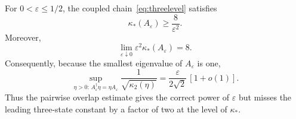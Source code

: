\begin{theorem}
\label{thm:metric_sandwich}
For $0<\varepsilon\leq1/2$, the coupled chain~\eqref{eq:threelevel}
satisfies
\begin{equation}\label{eq:metric_sandwich}
 \boxed{\kappa_*(A_\varepsilon)\geq\frac{8}{\varepsilon^2}.}
\end{equation}
Moreover,
\begin{equation}\label{eq:metric_limit}
 \boxed{\lim_{\varepsilon\downarrow0}
 \varepsilon^2\kappa_*(A_\varepsilon)=8.}
\end{equation}
Consequently, because the smallest eigenvalue of $A_\varepsilon$ is one,
\begin{equation}\label{eq:certificate_sharp_asymptotic}
 \sup_{\eta>0:\,A_\varepsilon^\dagger\eta=\eta A_\varepsilon}
 \frac{1}{\sqrt{\kappa_2(\eta)}}
 =\frac{\varepsilon}{2\sqrt2}\,[1+o(1)] .
\end{equation}
Thus the pairwise overlap estimate gives the correct power of
$\varepsilon$ but misses the leading three-state constant by a factor of two
at the level of $\kappa_*$.
\end{theorem}

